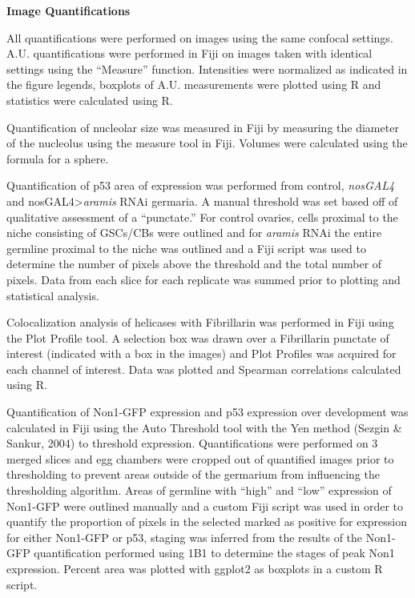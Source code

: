 \documentclass[12pt,oneside]{reedthesis}
\begin{document}
\textbf{Image Quantifications}

All quantifications were performed on images using the same confocal settings. A.U. quantifications were performed in Fiji on images taken with identical settings using the ``Measure'' function. Intensities were normalized as indicated in the figure legends, boxplots of A.U. measurements were plotted using R and statistics were calculated using R.

Quantification of nucleolar size was measured in Fiji by measuring the diameter of the nucleolus using the measure tool in Fiji. Volumes were calculated using the formula for a sphere.

Quantification of p53 area of expression was performed from control, \emph{nosGAL4} and nosGAL4\textgreater{}\emph{aramis} RNAi germaria. A manual threshold was set based off of qualitative assessment of a ``punctate.'' For control ovaries, cells proximal to the niche consisting of GSCs/CBs were outlined and for \emph{aramis} RNAi the entire germline proximal to the niche was outlined and a Fiji script was used to determine the number of pixels above the threshold and the total number of pixels. Data from each slice for each replicate was summed prior to plotting and statistical analysis.

Colocalization analysis of helicases with Fibrillarin was performed in Fiji using the Plot Profile tool. A selection box was drawn over a Fibrillarin punctate of interest (indicated with a box in the images) and Plot Profiles was acquired for each channel of interest. Data was plotted and Spearman correlations calculated using R.

Quantification of Non1-GFP expression and p53 expression over development was calculated in Fiji using the Auto Threshold tool with the Yen method (Sezgin \& Sankur, 2004) to threshold expression. Quantifications were performed on 3 merged slices and egg chambers were cropped out of quantified images prior to thresholding to prevent areas outside of the germarium from influencing the thresholding algorithm. Areas of germline with ``high'' and ``low'' expression of Non1-GFP were outlined manually and a custom Fiji script was used in order to quantify the proportion of pixels in the selected marked as positive for expression for either Non1-GFP or p53, staging was inferred from the results of the Non1-GFP quantification performed using 1B1 to determine the stages of peak Non1 expression. Percent area was plotted with ggplot2 as boxplots in a custom R script.
\end{document}
